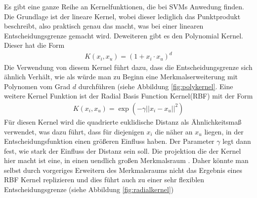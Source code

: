 \documentclass[
]{article}
\begin{document}
Es gibt eine ganze Reihe an Kernelfunktionen, die bei SVMs Anwedung
finden. Die Grundlage ist der lineare Kernel, wobei dieser lediglich das
Punktprodukt beschreibt, also praktisch genau das macht, was bei einer
linearen Entscheidungsgrenze gemacht wird. Deweiteren gibt es den
Polynomial Kernel. Dieser hat die Form \begin{align}
 K(x_i,x_u)=(1+x_i\cdot x_u)^d
\end{align} Die Verwendung von diesem Kernel führt dazu, dass die
Entscheidungsgrenze sich ähnlich Verhält, wie als würde man zu Beginn
eine Merkmalserweiterung mit Polynomen vom Grad \(d\) durchführen (siehe
Abbildung \ref{fig:polykernel}. Eine weitere Kernel Funktion ist der
Radial Basis Function Kernel(RBF) mit der Form \begin{align}
K(x_i,x_u)=\exp\left(-\gamma ||x_i-x_u||^2\right)
\end{align} Für diesen Kernel wird die quadrierte euklidische Distanz
als Ähnlichkeitsmaß verwendet, was dazu führt, dass für diejenigen
\(x_i\) die näher an \(x_u\) liegen, in der Entscheidungsfunktion einen
größeren Einfluss haben. Der Parameter \(\gamma\) legt dann fest, wie
stark der Einfluss der Distanz sein soll. Die projektion die der Kernel
hier macht ist eine, in einen uendlich großen Merkmalsraum . Daher
könnte man selbst durch vorgeriges Erweitern des Merkmalsraums nicht das
Ergebnis eines RBF Kernel replizieren und dies führt auch zu einer sehr
flexiblen Entscheidungsgrenze (siehe Abbildung \ref{fig:radialkernel})\\
\end{document}
